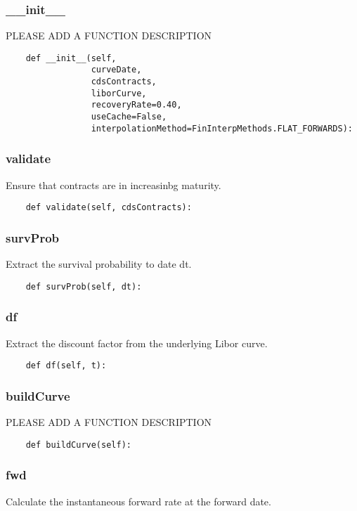 \documentclass[twoside,11pt]{book}
\begin{document}
\subsubsection*{{\bf \_\_init\_\_}}
PLEASE ADD A FUNCTION DESCRIPTION

\begin{lstlisting}
    def __init__(self,
                 curveDate,
                 cdsContracts,
                 liborCurve,
                 recoveryRate=0.40,
                 useCache=False,
                 interpolationMethod=FinInterpMethods.FLAT_FORWARDS):
\end{lstlisting}

\subsubsection*{{\bf validate}}
Ensure that contracts are in increasinbg maturity.  

\begin{lstlisting}
    def validate(self, cdsContracts):
\end{lstlisting}

\subsubsection*{{\bf survProb}}
Extract the survival probability to date dt.  

\begin{lstlisting}
    def survProb(self, dt):
\end{lstlisting}

\subsubsection*{{\bf df}}
Extract the discount factor from the underlying Libor curve.  

\begin{lstlisting}
    def df(self, t):
\end{lstlisting}

\subsubsection*{{\bf buildCurve}}
PLEASE ADD A FUNCTION DESCRIPTION

\begin{lstlisting}
    def buildCurve(self):
\end{lstlisting}

\subsubsection*{{\bf fwd}}
Calculate the instantaneous forward rate at the forward date.  
\end{document}
